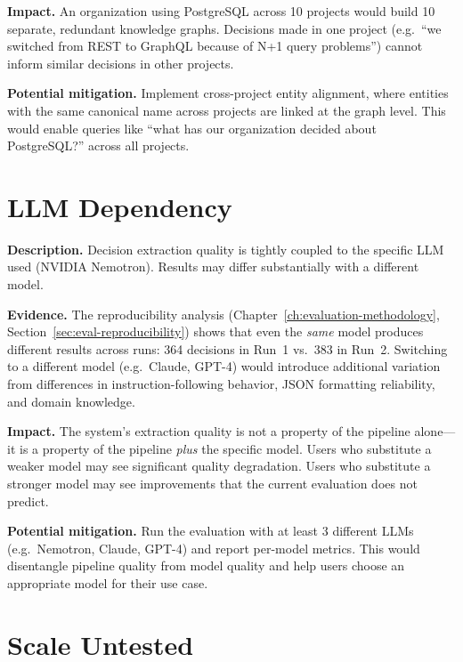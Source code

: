 \medskip\noindent\textbf{Impact.}
An organization using PostgreSQL across 10 projects would build 10
separate, redundant knowledge graphs.  Decisions made in one project
(e.g.\ ``we switched from REST to GraphQL because of N+1 query
problems'') cannot inform similar decisions in other projects.

\medskip\noindent\textbf{Potential mitigation.}
Implement cross-project entity alignment, where entities with the same
canonical name across projects are linked at the graph level.  This would
enable queries like ``what has our organization decided about
PostgreSQL?'' across all projects.


\section{LLM Dependency}
\label{sec:lim-llm-dependency}

\noindent\textbf{Description.}
Decision extraction quality is tightly coupled to the specific LLM used
(NVIDIA Nemotron).  Results may differ substantially with a different
model.

\medskip\noindent\textbf{Evidence.}
The reproducibility analysis (Chapter~\ref{ch:evaluation-methodology},
Section~\ref{sec:eval-reproducibility}) shows that even the \emph{same}
model produces different results across runs: 364 decisions in Run~1 vs.\
383 in Run~2.  Switching to a different model (e.g.\ Claude, GPT-4) would
introduce additional variation from differences in instruction-following
behavior, JSON formatting reliability, and domain knowledge.

\medskip\noindent\textbf{Impact.}
The system's extraction quality is not a property of the pipeline
alone---it is a property of the pipeline \emph{plus} the specific model.
Users who substitute a weaker model may see significant quality
degradation.  Users who substitute a stronger model may see improvements
that the current evaluation does not predict.

\medskip\noindent\textbf{Potential mitigation.}
Run the evaluation with at least 3 different LLMs (e.g.\ Nemotron,
Claude, GPT-4) and report per-model metrics.  This would disentangle
pipeline quality from model quality and help users choose an appropriate
model for their use case.


\section{Scale Untested}
\label{sec:lim-scale}

